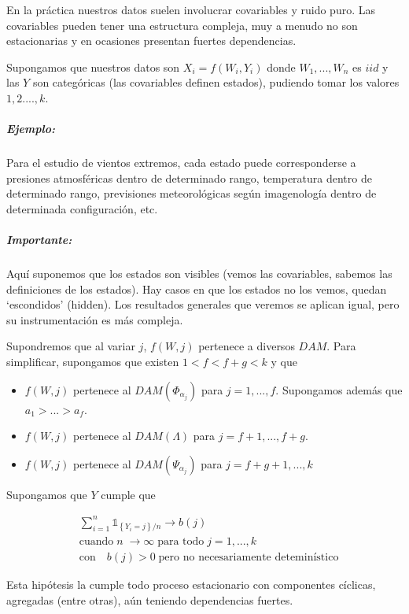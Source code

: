 \documentclass[
  12pt]{article}
\begin{document}
En la práctica nuestros datos suelen involucrar covariables y ruido
puro. Las covariables pueden tener una estructura compleja, muy a menudo
no son estacionarias y en ocasiones presentan fuertes dependencias.

Supongamos que nuestros datos son \(X_i=f(W_i,Y_i)\) donde
\(W_1,...,W_n\) es \(iid\) y las \(Y\) son categóricas (las covariables
definen estados), pudiendo tomar los valores \(1,2....,k\).

\subparagraph{Ejemplo:}\label{ejemplo}

Para el estudio de vientos extremos, cada estado puede corresponderse a
presiones atmosféricas dentro de determinado rango, temperatura dentro
de determinado rango, previsiones meteorológicas según imagenología
dentro de determinada configuración, etc.

\subparagraph{Importante:}\label{importante}

Aquí suponemos que los estados son visibles (vemos las covariables,
sabemos las definiciones de los estados). Hay casos en que los estados
no los vemos, quedan `escondidos' (hidden). Los resultados generales que
veremos se aplican igual, pero su instrumentación es más compleja.

Supondremos que al variar \(j\), \(f(W,j)\) pertenece a diversos
\(DAM\). Para simplificar, supongamos que existen \(1<f< f+g<k\) y que

\begin{itemize}
\item $f(W,j)$ pertenece al $DAM(\Phi_{\alpha_j})$ para $j=1,...,f$. Supongamos además que $a_1 > ... >a_f$.
\item $f(W,j)$ pertenece al $DAM(\Lambda)$ para $j=f+1,...,f+g$.
\item $f(W,j)$ pertenece al $DAM(\Psi_{\alpha_j})$ para $j=f+g+1,...,k$
\end{itemize}

Supongamos que \(Y\) cumple que

\begin{align}
&\sum_{i=1}^{n} \mathbb{1} _{\left\{ Y_i=j  \right\}/n} \longrightarrow b(j) \\
&\text{cuando}\;n\;\longrightarrow \infty \;\text{para todo}\;j=1,...,k \nonumber \\ 
&\text{con}\quad b(j)>0\;\text{pero no necesariamente deteminístico}\nonumber 
\end{align}

Esta hipótesis la cumple todo proceso estacionario con componentes
cíclicas, agregadas (entre otras), aún teniendo dependencias fuertes.
\end{document}
